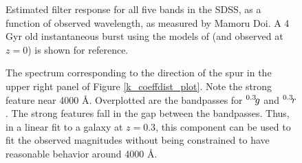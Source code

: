 \clearpage

\setcounter{thefigs}{0}

\clearpage
{}
\begin{figure}
\figurenum{\fignum}
\caption{\label{response_sdss} Estimated filter response for all five
bands in the SDSS, as a function of observed wavelength, as measured
by Mamoru Doi. A 4 Gyr old instantaneous burst using the models
of \citet{bruzual93a} (and observed at $z=0$) is shown for reference.}
\end{figure}

\clearpage
{}
\begin{figure}
\figurenum{\fignum}
\caption{\label{spur} The spectrum corresponding to the direction of
the spur in the upper right panel of Figure
\ref{k_coeffdist_plot}. Note the strong feature near 4000
\AA. Overplotted are the bandpasses for $^{{0.3}}\!{g}$ and
$^{{0.3}}\!{r}$. The strong features fall in the gap between the
bandpasses. Thus, in a linear fit to a galaxy at $z=0.3$, this
component can be used to fit the observed magnitudes without being
constrained to have reasonable behavior around 4000 \AA. }
\end{figure}


